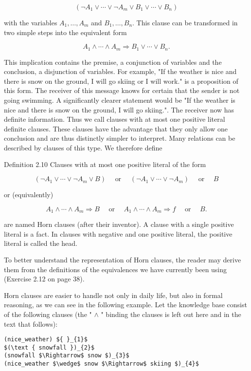 \documentclass[10pt]{article}
\begin{document}
$$
\left(\neg A_{1} \vee \cdots \vee \neg A_{m} \vee B_{1} \vee \cdots \vee B_{n}\right)
$$

with the variables $A_{1}, \ldots, A_{m}$ and $B_{1}, \ldots, B_{n}$. This clause can be transformed in two simple steps into the equivalent form

$$
A_{1} \wedge \cdots \wedge A_{m} \Rightarrow B_{1} \vee \cdots \vee B_{n} .
$$

This implication contains the premise, a conjunction of variables and the conclusion, a disjunction of variables. For example, "If the weather is nice and there is snow on the ground, I will go skiing or I will work." is a proposition of this form. The receiver of this message knows for certain that the sender is not going swimming. A significantly clearer statement would be "If the weather is nice and there is snow on the ground, I will go skiing.". The receiver now has definite information. Thus we call clauses with at most one positive literal definite clauses. These clauses have the advantage that they only allow one conclusion and are thus distinctly simpler to interpret. Many relations can be described by clauses of this type. We therefore define

Definition 2.10 Clauses with at most one positive literal of the form

$$
\left(\neg A_{1} \vee \cdots \vee \neg A_{m} \vee B\right) \quad \text { or } \quad\left(\neg A_{1} \vee \cdots \vee \neg A_{m}\right) \quad \text { or } \quad B
$$

or (equivalently)

$$
A_{1} \wedge \cdots \wedge A_{m} \Rightarrow B \quad \text { or } \quad A_{1} \wedge \cdots \wedge A_{m} \Rightarrow f \quad \text { or } \quad B .
$$

are named Horn clauses (after their inventor). A clause with a single positive literal is a fact. In clauses with negative and one positive literal, the positive literal is called the head.

To better understand the representation of Horn clauses, the reader may derive them from the definitions of the equivalences we have currently been using (Exercise 2.12 on page 38).

Horn clauses are easier to handle not only in daily life, but also in formal reasoning, as we can see in the following example. Let the knowledge base consist of the following clauses (the " $\wedge$ " binding the clauses is left out here and in the text that follows):

\begin{verbatim}
(nice_weather) ${ }_{1}$
$(\text { snowfall })_{2}$
(snowfall $\Rightarrow$ snow $)_{3}$
(nice_weather $\wedge$ snow $\Rightarrow$ skiing $)_{4}$
\end{verbatim}
\end{document}

